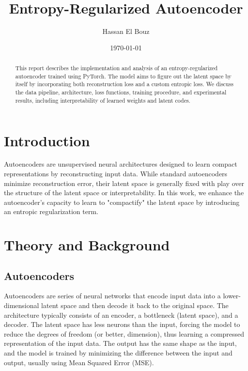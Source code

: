 \documentclass[12pt]{article}
\title{Entropy-Regularized Autoencoder}
\author{Hassan El Bouz}
\date{\today}
\begin{document}
\maketitle

\begin{abstract}
This report describes the implementation and analysis of an entropy-regularized autoencoder trained using PyTorch. The model aims to figure out the latent space by itself by incorporating both reconstruction loss and a custom entropic loss. We discuss the data pipeline, architecture, loss functions, training procedure, and experimental results, including interpretability of learned weights and latent codes.
\end{abstract}

\section{Introduction}
Autoencoders are unsupervised neural architectures designed to learn compact representations by reconstructing input data. While standard autoencoders minimize reconstruction error, their latent space is generally fixed with play over the structure of the latent space or interpretability. In this work, we enhance the autoencoder's capacity to learn to "compactify" the latent space by introducing an entropic regularization term.

\section{Theory and Background}
\subsection{Autoencoders}
Autoencoders are series of neural networks that encode input data into a lower-dimensional latent space and then decode it back to the original space. The architecture typically consists of an encoder, a bottleneck (latent space), and a decoder. The latent space has less neurons than the input, forcing the model to reduce the degrees of freedom (or better, dimension), thus learning a compressed representation of the input data. The output has the same shape as the input, and the model is trained by minimizing the difference between the input and output, usually using Mean Squared Error (MSE).
\end{document}
